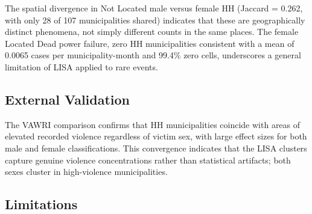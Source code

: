 The spatial divergence in Not Located male versus female HH (Jaccard = 0.262, with only 28 of 107 municipalities shared) indicates that these are geographically distinct phenomena, not simply different counts in the same places.
The female Located Dead power failure, zero HH municipalities consistent with a mean of 0.0065 cases per municipality-month and 99.4\% zero cells, underscores a general limitation of LISA applied to rare events.

\subsection{External Validation}
\label{sec:disc_vawri}

The VAWRI comparison confirms that HH municipalities coincide with areas of elevated recorded violence regardless of victim sex, with large effect sizes for both male and female classifications.
This convergence indicates that the LISA clusters capture genuine violence concentrations rather than statistical artifacts; both sexes cluster in high-violence municipalities.


\subsection{Limitations}
\label{sec:limitations}

